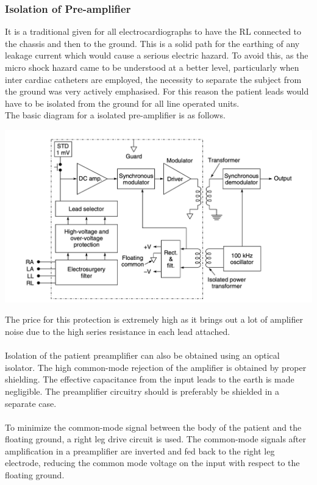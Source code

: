 \documentclass{article}
\begin{document}
\subsubsection{Isolation of Pre-amplifier}
It is a traditional given for all electrocardiographs to have the RL connected to the chassis and then to the ground. This is a solid path for the earthing of any leakage current which would cause a serious electric hazard. To avoid this, as the micro shock hazard came to be understood at a better level, particularly when inter cardiac catheters are employed, the necessity to separate the subject from the ground was very actively emphasised. For this reason the patient leads would have to be isolated from the ground for all line operated units.\\
The basic diagram for a isolated pre-amplifier is as follows.
\begin{center}
    \includegraphics[scale=0.4]{Screenshot 2023-05-02 at 7.31.20 PM.png}
\end{center}
The price for this protection is extremely high as it brings out a lot of amplifier noise due to the high series resistance in each lead attached.\\
\\
Isolation of the patient preamplifier can also be obtained using an optical isolator. The high common-mode rejection of the amplifier is obtained by proper shielding. The effective capacitance from the input leads to the earth is made negligible. The preamplifier circuitry should is preferably be shielded in a separate case.\\
\\
To minimize the common-mode signal between the body of the patient and the floating ground, a right leg drive circuit is used. The common-mode signals after amplification in a preamplifier are inverted and fed back to the right leg electrode, reducing the common mode voltage on the input with respect to the floating ground.
\end{document}
